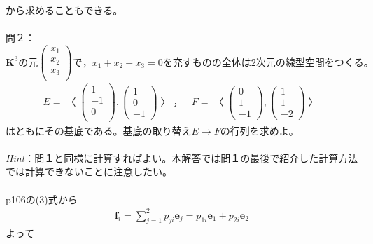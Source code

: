 \documentclass[dvipdfmx,uplatex,11pt]{jsarticle}
\begin{document}
から求めることもできる。\\ \\
問２：$\bm{K}^3の元
\begin{pmatrix}
x_1 \\
x_2 \\
x_3 \\
\end{pmatrix}
で，x_1+x_2+x_3=0を充すものの全体は2次元の線型空間をつくる。
$
\begin{eqnarray*}
E=〈
\begin{pmatrix}
1 \\
-1 \\
0 \\
\end{pmatrix}
,
\begin{pmatrix}
1 \\
0 \\
-1
\end{pmatrix}
〉，~~~~F=〈
\begin{pmatrix}
0 \\
1 \\
-1
\end{pmatrix}
,
\begin{pmatrix}
1 \\
1 \\
-2
\end{pmatrix}
〉
\end{eqnarray*}
はともにその基底である。基底の取り替え$E→Fの行列を求めよ。$\\ \\
\textsl{Hint}：問１と同様に計算すればよい。本解答では問１の最後で紹介した計算方法では計算できないことに注意したい。\\ \\
p106の(3)式から
\begin{eqnarray*}
\bm{f}_i=\sum^{2}_{j=1}p_{ji}\bm{e}_{j}=p_{1i}\bm{e}_1+p_{2i}\bm{e}_2
\end{eqnarray*}
よって
\end{document}
